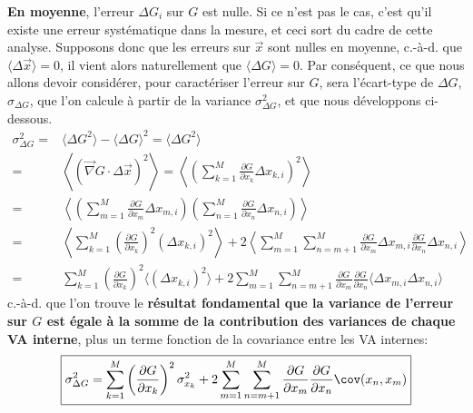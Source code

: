 \textbf{En moyenne}, l'erreur $\Delta G_i$ sur $G$ est nulle. Si ce n'est pas le cas, c'est qu'il existe une erreur systématique dans la mesure, et ceci sort du cadre de cette analyse. Supposons donc que les erreurs sur $\vec{x}$ sont nulles en moyenne, c.-à-d. que $\langle\Delta\vec{x}\rangle=0$, il vient alors naturellement que $\langle\Delta G\rangle=0$. Par conséquent, ce que nous allons devoir considérer, pour caractériser l'erreur sur $G$, sera l'écart-type de  $\Delta G$, $\sigma_{\Delta G}$, que l'on calcule à partir de la variance $\sigma_{\Delta G}^2$, et que nous développons ci-dessous.
\begin{align*}
    \sigma_{\Delta G}^2= & \langle\Delta G^2\rangle-\langle\Delta G\rangle^2=
    \langle\Delta G^2\rangle                                                                                                                                                                                                                                                                                          \\
    =                    & \left\langle\left(\vec{\nabla} G\cdot\Delta\vec{x}\right)^2\right\rangle=\left\langle\left(\sum\limits_{k=1}^{M}\frac{\partial G}{\partial x_k}\Delta x_{k,i}\right)^2\right\rangle                                                                                                        \\
    =                    & \left\langle\left(\sum\limits_{m=1}^{M}\frac{\partial G}{\partial x_m}\Delta x_{m,i}\right)\left(\sum\limits_{n=1}^{M}\frac{\partial G}{\partial x_n}\Delta x_{n,i}\right)\right\rangle                                                                                                    \\
    =                    & \left\langle\sum\limits_{k=1}^{M}\left(\frac{\partial G}{\partial x_k}\right)^2\left(\Delta x_{k,i}\right)^2\right\rangle+2\left\langle\sum\limits_{m=1}^{M}\sum\limits_{n=m+1}^{M}\frac{\partial G}{\partial x_m}\Delta x_{m,i}\frac{\partial G}{\partial x_n}\Delta x_{n,i}\right\rangle \\
    =                    & \sum\limits_{k=1}^{M}\left(\frac{\partial G}{\partial x_k}\right)^2\langle\left(\Delta x_{k,i}\right)^2\rangle+2\sum\limits_{m=1}^{M}\sum\limits_{n=m+1}^{M}\frac{\partial G}{\partial x_m}\frac{\partial G}{\partial x_n}\langle\Delta x_{m,i}\Delta x_{n,i}\rangle
\end{align*}
c.-à-d. que l'on trouve le \textbf{résultat fondamental que la variance de l'erreur sur $G$ est égale à la somme de la contribution des variances de chaque VA interne}, plus un terme fonction de la covariance entre les VA internes:
\begin{equation}
    \boxed{\sigma^2_{\Delta G}=\sum\limits_{k=1}^{M}\left(\frac{\partial G}{\partial x_k}\right)^2\sigma_{x_k}^2
    +2\sum\limits_{m=1}^{M}\sum\limits_{n=m+1}^{M}\frac{\partial G}{\partial x_m}\frac{\partial G}{\partial x_n}\cov(x_n,x_m)}
    \label{eq:sdg2}
\end{equation}

